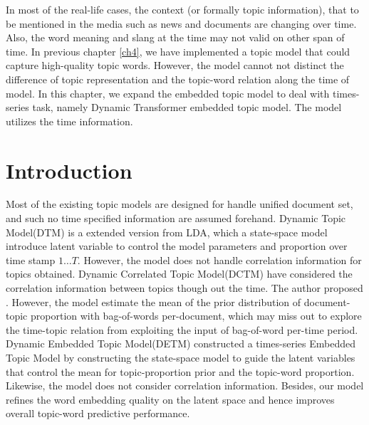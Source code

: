 In most of the real-life cases, the context (or formally topic information), that to be mentioned in the media such as news and documents are changing over time. Also, the word meaning and slang at the time may not valid on other span of time.
In previous chapter \ref{ch4}, we have implemented a topic model that could capture high-quality topic words. However, the model cannot not distinct the difference of topic representation and the topic-word relation along the time of model.
In this chapter, we expand the embedded topic model to deal with times-series task, namely Dynamic Transformer embedded topic model. The model utilizes the time information.
\section{Introduction}
Most of the existing topic models are designed for handle unified document set, and such no time specified information are assumed forehand. 
Dynamic Topic Model(DTM)\cite{blei_dynamic_2006} is a extended version from LDA, which a state-space model introduce latent variable to control the model parameters and proportion over time stamp $ 1\dots T $. However, the model does not handle correlation information for topics obtained.
Dynamic Correlated Topic Model(DCTM)\cite{tomasi_stochastic_nodate} have considered the correlation information between topics though out the time. The author proposed . However, the model estimate the mean of the prior distribution of document-topic proportion with bag-of-words per-document, which may miss out to explore the time-topic relation from exploiting the input of bag-of-word per-time period.
Dynamic Embedded Topic Model(DETM)\cite{dieng_dynamic_2019} constructed a times-series Embedded Topic Model by constructing the state-space model to guide the latent variables that control the mean for topic-proportion prior and the topic-word proportion. Likewise, the model does not consider correlation information. Besides, our model refines the word embedding quality on the latent space and hence improves overall topic-word predictive performance.
